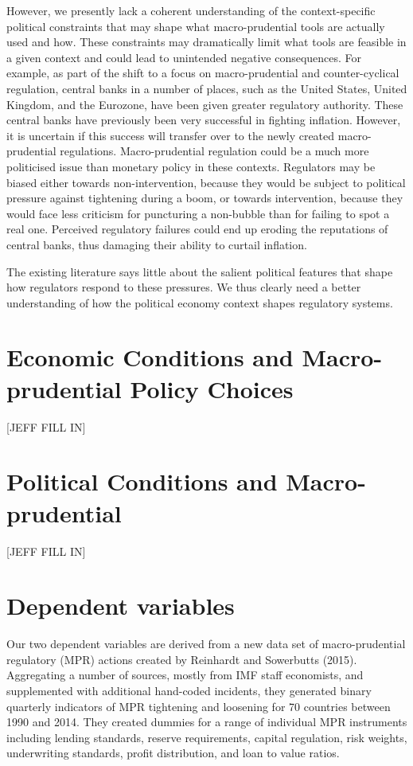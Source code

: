 \documentclass[]{article}
\begin{document}
However, we presently lack a coherent understanding of the
context-specific political constraints that may shape what
macro-prudential tools are actually used and how. These constraints may
dramatically limit what tools are feasible in a given context and could
lead to unintended negative consequences. For example, as part of the
shift to a focus on macro-prudential and counter-cyclical regulation,
central banks in a number of places, such as the United States, United
Kingdom, and the Eurozone, have been given greater regulatory authority.
These central banks have previously been very successful in fighting
inflation. However, it is uncertain if this success will transfer over
to the newly created macro-prudential regulations. Macro-prudential
regulation could be a much more politicised issue than monetary policy
in these contexts. Regulators may be biased either towards
non-intervention, because they would be subject to political pressure
against tightening during a boom, or towards intervention, because they
would face less criticism for puncturing a non-bubble than for failing
to spot a real one. Perceived regulatory failures could end up eroding
the reputations of central banks, thus damaging their ability to curtail
inflation.

The existing literature says little about the salient political features
that shape how regulators respond to these pressures. We thus clearly
need a better understanding of how the political economy context shapes
regulatory systems.

\section{Economic Conditions and Macro-prudential Policy
Choices}\label{economic-conditions-and-macro-prudential-policy-choices}

{[}JEFF FILL IN{]}

\section{Political Conditions and
Macro-prudential}\label{political-conditions-and-macro-prudential}

{[}JEFF FILL IN{]}

\section{Dependent variables}\label{dependent-variables}

Our two dependent variables are derived from a new data set of
macro-prudential regulatory (MPR) actions created by Reinhardt and
Sowerbutts (2015). Aggregating a number of sources, mostly from IMF
staff economists, and supplemented with additional hand-coded incidents,
they generated binary quarterly indicators of MPR tightening and
loosening for 70 countries between 1990 and 2014. They created dummies
for a range of individual MPR instruments including lending standards,
reserve requirements, capital regulation, risk weights, underwriting
standards, profit distribution, and loan to value ratios.
\end{document}
